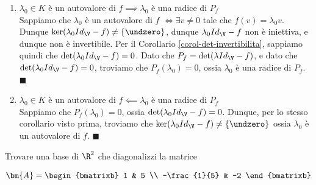 \documentclass[11pt, a4paper, titlepage, oneside]{scrbook}
\begin{document}
\begin{enumerate}[label=\arabic*°]
    \item $\lambda_0 \in K$ è un autovalore di $f \implies \lambda_0$ è una radice di $P_f$\\ 
    Sappiamo che $\lambda_0$ è un autovalore di $f$ $\iff \exists v \neq 0$ tale che $f(v) = \lambda_0 v$. Dunque $\ker(\lambda_0 Id_\V - f) \neq \{\undzero\}$, dunque $\lambda_0 Id_\V -  f$ non è iniettiva, e dunque non è invertibile. Per il Corollario \ref{corol-det-invertibilita}, sappiamo quindi che $\det(\lambda_0 Id_\V - f) = 0$. Dato che $P_f = \det(\lambda Id_\V - f)$, e dato che $\det (\lambda_0 Id_\V - f) = 0$, troviamo che $P_f(\lambda_0) = 0$, ossia $\lambda_0$ è una radice di $P_f$. $\blacksquare$
    \item $\lambda_0 \in K$ è un autovalore di $f \impliedby \lambda_0$ è una radice di $P_f$\\ 
    Sappiamo che $P_f(\lambda_0) = 0$, ossia $\det (\lambda_0 Id_\V - f) = 0$. Dunque, per lo stesso corollario visto prima, troviamo che $\ker (\lambda_0 Id_\V - f) \neq \{\undzero\}$ ossia $\lambda_0$ è un autovalore di $f$. $\blacksquare$
\end{enumerate}


\Esempio \nopagebreak

Trovare una base di $\R^2$ che diagonalizzi la matrice \nopagebreak

\[\bm{A} = 
\begin{bmatrixb}
    1 & 5 \\
    -\frac{1}{5} & -2
\end{bmatrixb}
\]
\end{document}
